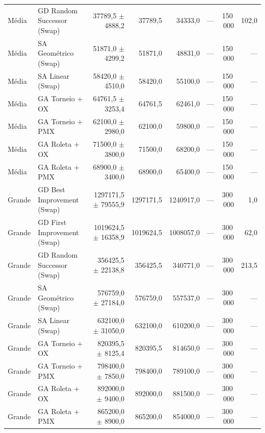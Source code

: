 \documentclass[11pt,a4paper]{article}
\begin{document}
\begin{table}[H]
{\begin{tabular}{llrrrrrr}
Média   & GD Random Successor (Swap)  & 37789{,}5 $\pm$ 4888{,}2 & 37789{,}5 & 34333{,}0 & --- & 150\,000 & 102{,}0 \\
Média   & SA Geométrico (Swap)        & 51871{,}0 $\pm$ 4299{,}2 & 51871{,}0 & 48831{,}0 & --- & 150\,000 & --- \\
Média   & SA Linear (Swap)            & 58420{,}0 $\pm$ 4510{,}0 & 58420{,}0 & 55100{,}0 & --- & 150\,000 & --- \\
Média   & GA Torneio + OX             & 64761{,}5 $\pm$ 3253{,}4 & 64761{,}5 & 62461{,}0 & --- & 150\,000 & --- \\
Média   & GA Torneio + PMX            & 62100{,}0 $\pm$ 2980{,}0 & 62100{,}0 & 59800{,}0 & --- & 150\,000 & --- \\
Média   & GA Roleta + OX              & 71500{,}0 $\pm$ 3800{,}0 & 71500{,}0 & 68200{,}0 & --- & 150\,000 & --- \\
Média   & GA Roleta + PMX             & 68900{,}0 $\pm$ 3400{,}0 & 68900{,}0 & 65400{,}0 & --- & 150\,000 & --- \\
\midrule
Grande  & GD Best Improvement (Swap) & 1297171{,}5 $\pm$ 79555{,}9 & 1297171{,}5 & 1240917{,}0 & --- & 300\,000 & 1{,}0 \\
Grande  & GD First Improvement (Swap) & 1019624{,}5 $\pm$ 16358{,}9 & 1019624{,}5 & 1008057{,}0 & --- & 300\,000 & 62{,}0 \\
Grande  & GD Random Successor (Swap)  & 356425{,}5 $\pm$ 22138{,}8 & 356425{,}5 & 340771{,}0 & --- & 300\,000 & 213{,}5 \\
Grande  & SA Geométrico (Swap)        & 576759{,}0 $\pm$ 27184{,}0 & 576759{,}0 & 557537{,}0 & --- & 300\,000 & --- \\
Grande  & SA Linear (Swap)            & 632100{,}0 $\pm$ 31050{,}0 & 632100{,}0 & 610200{,}0 & --- & 300\,000 & --- \\
Grande  & GA Torneio + OX             & 820395{,}5 $\pm$ 8125{,}4 & 820395{,}5 & 814650{,}0 & --- & 300\,000 & --- \\
Grande  & GA Torneio + PMX            & 798400{,}0 $\pm$ 7850{,}0 & 798400{,}0 & 789100{,}0 & --- & 300\,000 & --- \\
Grande  & GA Roleta + OX              & 892000{,}0 $\pm$ 9400{,}0 & 892000{,}0 & 881500{,}0 & --- & 300\,000 & --- \\
Grande  & GA Roleta + PMX             & 865200{,}0 $\pm$ 8900{,}0 & 865200{,}0 & 854000{,}0 & --- & 300\,000 & --- \\
\bottomrule
\end{tabular}
}
\end{table}
\end{document}
